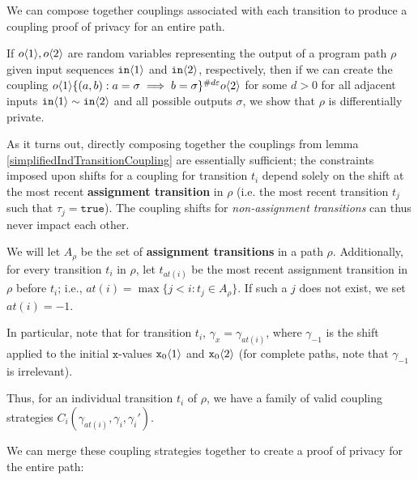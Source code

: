 We can compose together couplings associated with each transition to produce a coupling proof of privacy for an entire path. 

If $o\langle1 \rangle, o\langle2 \rangle$ are random variables representing the output of a program path $\rho$ given input sequences $\texttt{in}\langle1 \rangle$ and $\texttt{in}\langle2 \rangle$, respectively, 
then if we can create the coupling $o\langle1 \rangle\{(a, b): a=\sigma\implies b=\sigma\}^{\#d\varepsilon}o\langle2 \rangle$ for some $d>0$ for all adjacent inputs $\texttt{in}\langle1 \rangle\sim\texttt{in}\langle2 \rangle$ and all possible outputs $\sigma$, we show that $\rho$ is differentially private.

As it turns out, directly composing together the couplings from lemma \ref{simplifiedIndTransitionCoupling} are essentially sufficient; the constraints imposed upon shifts for a coupling for transition $t_i$ depend solely on the shift at the most recent \textbf{assignment transition} in $\rho$ (i.e. the most recent transition $t_j$ such that $\tau_j = \texttt{true}$). 
The coupling shifts for \textit{non-assignment transitions} can thus never impact each other. 

We will let $A_\rho$ be the set of \textbf{assignment transitions} in a path $\rho$. Additionally, for every transition $t_i$ in $\rho$, let $t_{at(i)}$ be the most recent assignment transition in $\rho$ before $t_i$; i.e., $at(i) = \max\{j<i: t_j\in A_\rho\}$. If such a $j$ does not exist, we set $at(i)=-1$. 

In particular, note that for transition $t_i$, $\gamma_x = \gamma_{at(i)}$, where $\gamma_{-1}$ is the shift applied to the initial $\texttt{x}$-values $\texttt{x}_0\langle1 \rangle$ and $\texttt{x}_0\langle2 \rangle$ (for complete paths, note that $\gamma_{-1}$ is irrelevant).

Thus, for an individual transition $t_i$ of $\rho$, we have a family of valid coupling strategies $C_i(\gamma_{at(i)}, \gamma_i, \gamma_i')$. 

We can merge these coupling strategies together to create a proof of privacy for the entire path: 

